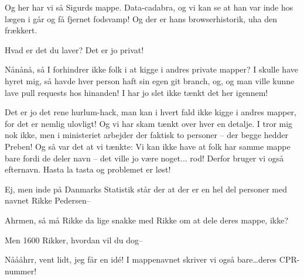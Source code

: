 \documentclass[a4paper,11pt]{article}
\begin{document}
\begin{sketch}

 Og her har vi så Sigurds mappe.  Data-cadabra, og vi
kan se at han var inde hos lægen i går og få fjernet fodsvamp!  Og der er hans
browserhistorik, uha den frækkert.


 Hvad er det du laver?  Det er jo privat!

 Nånånå, så I forhindrer ikke folk i at kigge i andres private mapper?
I skulle have hyret mig, så havde hver person haft sin egen git branch, og, og
 man ville kunne lave pull requests hos hinanden!  I
har jo slet ikke tænkt det her igennem!

 Det er jo det rene hurlum-hack, man kan i hvert fald ikke kigge i
andres mapper, for det er nemlig ulovligt!  Og vi har skam tænkt over hver en
detalje.  I tror mig nok ikke, men i ministeriet arbejder der faktisk to
personer -- der begge hedder Preben!   Og så var det at
vi tænkte: Vi kan ikke have at folk har samme mappe bare fordi de deler navn --
det ville jo være noget... rod!  Derfor bruger vi også efternavn.  Hasta la
tasta og problemet er løst!

  Ej, men inde på
Danmarks Statistik står der at der er en hel del personer med navnet Rikke
Pedersen--

 Ahrmen, så må Rikke da lige snakke med  Rikke om at dele deres mappe, ikke?

 Men 1600 Rikker, hvordan vil du dog--

 Nåååhrr, vent lidt, jeg får en idé!  I mappenavnet skriver vi også
bare\ldots deres CPR-nummer!


\end{sketch}
\end{document}
